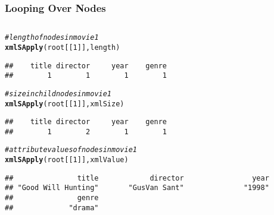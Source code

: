 \documentclass[12pt]{beamer}\usepackage[]{graphicx}\usepackage[]{color}
\makeatletter
\newcommand{\hlnum}[1]{\textcolor[rgb]{0.686,0.059,0.569}{#1}}%
\newcommand{\hlcom}[1]{\textcolor[rgb]{0.678,0.584,0.686}{\textit{#1}}}%
\newcommand{\hlstd}[1]{\textcolor[rgb]{0.345,0.345,0.345}{#1}}%
\newcommand{\hlkwd}[1]{\textcolor[rgb]{0.737,0.353,0.396}{\textbf{#1}}}%
\newenvironment{kframe}{%
 \def\at@end@of@kframe{}%
 \ifinner\ifhmode%
  \def\at@end@of@kframe{\end{minipage}}%
  \begin{minipage}{\columnwidth}%
 \fi\fi%
 \def\FrameCommand##1{\hskip\@totalleftmargin \hskip-\fboxsep
 \colorbox{shadecolor}{##1}\hskip-\fboxsep
     \hskip-\linewidth \hskip-\@totalleftmargin \hskip\columnwidth}%
 \MakeFramed {\advance\hsize-\width
   \@totalleftmargin\z@ \linewidth\hsize
   \@setminipage}}%
 {\par\unskip\endMakeFramed%
 \at@end@of@kframe}
\newenvironment{knitrout}{}{} %
\makeatother
\begin{document}

\begin{frame}[fragile]
\frametitle{Looping Over Nodes}

\begin{columns}[t]
\begin{column}{0.5\textwidth}
\begin{knitrout}\tiny
{}\color{fgcolor}\begin{kframe}
\begin{alltt}
\hlcom{# length of nodes in movie 1}
\hlkwd{xmlSApply}\hlstd{(root[[}\hlnum{1}\hlstd{]], length)}
\end{alltt}
\begin{verbatim}
##    title director     year    genre 
##        1        1        1        1
\end{verbatim}
\begin{alltt}
\hlcom{# size in child nodes in movie 1}
\hlkwd{xmlSApply}\hlstd{(root[[}\hlnum{1}\hlstd{]], xmlSize)}
\end{alltt}
\begin{verbatim}
##    title director     year    genre 
##        1        2        1        1
\end{verbatim}
\begin{alltt}
\hlcom{# attribute values of nodes in movie 1}
\hlkwd{xmlSApply}\hlstd{(root[[}\hlnum{1}\hlstd{]], xmlValue)}
\end{alltt}
\begin{verbatim}
##               title            director                year 
## "Good Will Hunting"       "GusVan Sant"              "1998" 
##               genre 
##             "drama"
\end{verbatim}
\end{kframe}
\end{knitrout}
\end{column}


\end{columns}
\end{frame}
\end{document}
